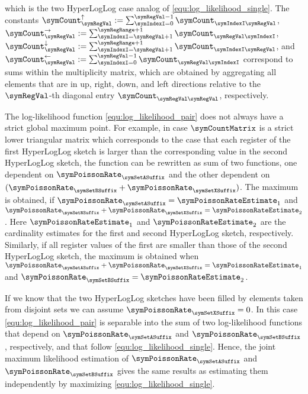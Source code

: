 \documentclass[a4paper]{scrartcl}
\begin{document}
which is the two HyperLogLog case analog of \eqref{equ:log_likelihood_single}.
The constants $\symCount^\uparrow_\symRegVal:=\sum_{\symIndexI=0}^{\symRegVal-1} \symCount_{\symIndexI\symRegVal}$, $\symCount^\rightarrow_\symRegVal:=\sum_{\symIndexI=\symRegVal+1}^{\symRegRange+1} \symCount_{\symRegVal\symIndexI}$, $\symCount^\downarrow_\symRegVal:=\sum_{\symIndexI=\symRegVal+1}^{\symRegRange+1} \symCount_{\symIndexI\symRegVal}$, and $\symCount^\leftarrow_\symRegVal:=\sum_{\symIndexI=0}^{\symRegVal-1} \symCount_{\symRegVal\symIndexI}$ correspond to sums within the multiplicity matrix, which are obtained by aggregating all elements that are in up, right, down, and left directions relative to the $\symRegVal$-th diagonal entry  $\symCount_{\symRegVal\symRegVal}$, respectively.

The log-likelihood function \eqref{equ:log_likelihood_pair} does not always have a strict global maximum point. For example, in case $\symCountMatrix$ is a strict lower triangular matrix which corresponds to the case that each register of the first HyperLogLog sketch is larger than the corresponding value in the second HyperLogLog sketch, the function can be rewritten as sum of two functions, one dependent on $\symPoissonRate_\symSetASuffix$ and the other dependent on $(\symPoissonRate_\symSetBSuffix+\symPoissonRate_\symSetXSuffix)$. 
The maximum is obtained, if $\symPoissonRate_\symSetASuffix = \symPoissonRateEstimate_1$ and $\symPoissonRate_\symSetBSuffix+\symPoissonRate_\symSetXSuffix = \symPoissonRateEstimate_2$. Here $\symPoissonRateEstimate_1$ and $\symPoissonRateEstimate_2$ are the cardinality estimates for the first and second HyperLogLog sketch, respectively. Similarly, if all register values of the first are smaller than those of the second HyperLogLog sketch, the maximum is obtained when 
$\symPoissonRate_\symSetASuffix+\symPoissonRate_\symSetXSuffix = \symPoissonRateEstimate_1$ and $\symPoissonRate_\symSetBSuffix = \symPoissonRateEstimate_2$.

If we know that the two HyperLogLog sketches have been filled by elements taken from disjoint sets we can assume $\symPoissonRate_\symSetXSuffix=0$. In this case \eqref{equ:log_likelihood_pair} is separable into the sum of two log-likelihood functions that depend on $\symPoissonRate_\symSetASuffix$ and $\symPoissonRate_\symSetBSuffix$, respectively, and that follow \eqref{equ:log_likelihood_single}. Hence, the joint maximum likelihood estimation of $\symPoissonRate_\symSetASuffix$ and $\symPoissonRate_\symSetBSuffix$ gives the same results as estimating them independently by maximizing \eqref{equ:log_likelihood_single}.
\end{document}
